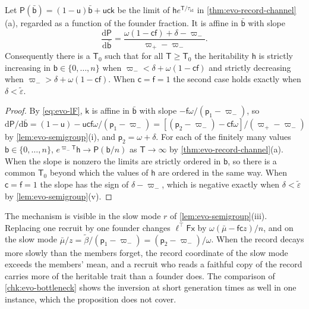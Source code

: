 \begin{proposition}\label{prop:evo-bottleneck}
Let $\mathsf P(\bar{\mathsf b})=(1-\mathsf u)\bar{\mathsf b}+\mathsf u\mathsf c\mathsf k$ be the limit of $\mathsf he^{\mathsf T/\tau_{\mathrm{id}}}$ in \cref{thm:evo-record-channel}(a), regarded as a function of the founder fraction. It is affine in $\bar{\mathsf b}$ with slope
\begin{equation}\label{eq:evo-bottleneck-slope}
\frac{\mathrm d\mathsf P}{\mathrm d\bar{\mathsf b}}=\frac{\omega(1-\mathsf c\mathsf f)+\delta-\varpi_-}{\varpi_+-\varpi_-}.
\end{equation}
Consequently there is a $\mathsf T_0$ such that for all $\mathsf T\ge\mathsf T_0$ the heritability $\mathsf h$ is strictly increasing in $\mathsf b\in\{0,\dots,n\}$ when $\varpi_-<\delta+\omega(1-\mathsf c\mathsf f)$ and strictly decreasing when $\varpi_->\delta+\omega(1-\mathsf c\mathsf f)$. When $\mathsf c=\mathsf f=1$ the second case holds exactly when $\delta<\tilde\varepsilon$.
\end{proposition}

\begin{proof}
By \eqref{eq:evo-lF}, $\mathsf k$ is affine in $\bar{\mathsf b}$ with slope $-\mathsf f\omega/(\mathsf p_1-\varpi_-)$, so $\mathrm d\mathsf P/\mathrm d\bar{\mathsf b}=(1-\mathsf u)-\mathsf u\mathsf c\mathsf f\omega/(\mathsf p_1-\varpi_-)=[(\mathsf p_2-\varpi_-)-\mathsf c\mathsf f\omega]/(\varpi_+-\varpi_-)$ by \cref{lem:evo-semigroup}(i), and $\mathsf p_2=\omega+\delta$. For each of the finitely many values $\mathsf b\in\{0,\dots,n\}$, $e^{\varpi_-\mathsf T}\mathsf h\to\mathsf P(\mathsf b/n)$ as $\mathsf T\to\infty$ by \cref{thm:evo-record-channel}(a). When the slope is nonzero the limits are strictly ordered in $\mathsf b$, so there is a common $\mathsf T_0$ beyond which the values of $\mathsf h$ are ordered in the same way. When $\mathsf c=\mathsf f=1$ the slope has the sign of $\delta-\varpi_-$, which is negative exactly when $\delta<\tilde\varepsilon$ by \cref{lem:evo-semigroup}(v).
\end{proof}

The mechanism is visible in the slow mode $r$ of \cref{lem:evo-semigroup}(iii). Replacing one recruit by one founder changes $\ell^\top\mathsf F\mathsf x$ by $\omega(\bar\mu-\mathsf f\mathsf cz)/n$, and on the slow mode $\bar\mu/z=\tilde\beta/(\mathsf p_1-\varpi_-)=(\mathsf p_2-\varpi_-)/\omega$. When the record decays more slowly than the members forget, the record coordinate of the slow mode exceeds the members' mean, and a recruit who reads a faithful copy of the record carries more of the heritable trait than a founder does. The comparison of \cref{chk:evo-bottleneck} shows the inversion at short generation times as well in one instance, which the proposition does not cover.

